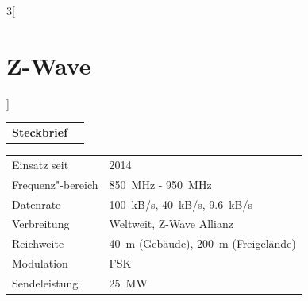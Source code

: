 \begin{multicols}{3}[\section{Z-Wave}]


\newrefsegment

\begin{tabular}{p{}p{2.7 cm}}
\textbf{Steckbrief}& \\
\end{tabular}
\begin{tabular}{p{}p{2.7 cm}}
      Einsatz seit & 2014\\
      Frequenz"-bereich  & \SI{850}{\mega\hertz} - \SI{950}{\mega\hertz}\\
      Datenrate & \SI{100}{kB/s}, \SI{40}{kB/s}, \SI{9,6}{kB/s}\\
      Verbreitung & Weltweit, Z-Wave Allianz\\
      Reichweite & \SI{40}{\metre} (Gebäude), \SI{200}{\metre} (Freigelände)\\
      Modulation & FSK\\
      Sendeleistung & \SI{25}{\mega\watt}\\
\end{tabular}
\par

\end{multicols}
